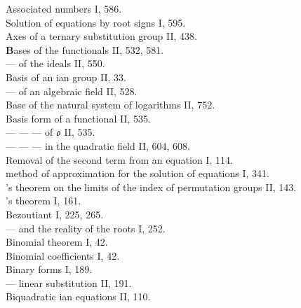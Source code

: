 Associated numbers I, 586.\\
Solution of equations by root signs I, 595.\\
Axes of a ternary substitution group II, 438.\\

\medskip
\noindent
\textbf{B}ases of the functionals II, 532, 581.\\
--- of the ideals II, 550.\\
Basis of an ian group II, 33.\\
--- of an algebraic field II, 528.\\
Base of the natural system of logarithms II, 752.\\
Basis form of a functional II, 535.\\
--- --- --- of $\mathfrak{o}$ II, 535.\\
--- --- --- in the quadratic field II, 604, 608.\\
Removal of the second term from an equation I, 114.\\
 method of approximation for the solution of equations I, 341.\\
's theorem on the limits of the index of permutation groups II, 143.\\
's theorem I, 161.\\
Bezoutiant I, 225, 265.\\
--- and the reality of the roots I, 252.\\
Binomial theorem I, 42.\\
Binomial coefficients I, 42.\\
Binary forms I, 189.\\
--- linear substitution II, 191.\\
Biquadratic ian equations II, 110.\\

\bigskip
\noindent
